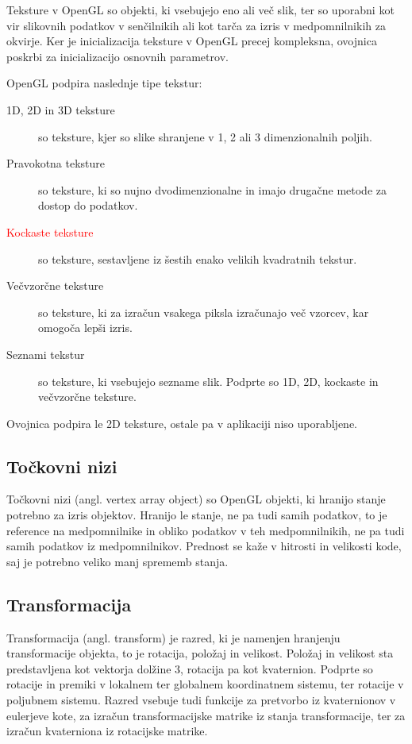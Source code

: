 \documentclass[a4paper, 12pt]{book}
\begin{document}
Teksture v OpenGL so objekti, ki vsebujejo eno ali več slik, ter so uporabni kot vir slikovnih podatkov v senčilnikih ali kot tarča za izris v medpomnilnikih za okvirje. Ker je inicializacija teksture v OpenGL precej kompleksna, ovojnica poskrbi za inicializacijo osnovnih parametrov.

OpenGL podpira naslednje tipe tekstur:

\begin{description}
\item [1D, 2D in 3D teksture]so teksture, kjer so slike shranjene v 1, 2 ali 3 dimenzionalnih poljih.
\item [Pravokotna teksture]so teksture, ki so nujno dvodimenzionalne in imajo drugačne metode za dostop do podatkov.
\item [\textcolor{red}{Kockaste teksture}]so teksture, sestavljene iz šestih enako velikih kvadratnih tekstur.
\item [Večvzorčne teksture]so teksture, ki za izračun vsakega piksla izračunajo več vzorcev, kar omogoča lepši izris.
\item [Seznami tekstur]so teksture, ki vsebujejo sezname slik. Podprte so 1D, 2D, kockaste in večvzorčne teksture.
\end{description}

Ovojnica podpira le 2D teksture, ostale pa v aplikaciji niso uporabljene.

\subsection{Točkovni nizi}

Točkovni nizi (angl. vertex array object) so OpenGL objekti, ki hranijo stanje potrebno za izris objektov. Hranijo le stanje, ne pa tudi samih podatkov, to je reference na medpomnilnike in obliko podatkov v teh medpomnilnikih, ne pa tudi samih podatkov iz medpomnilnikov. Prednost se kaže v hitrosti in velikosti kode, saj je potrebno veliko manj sprememb stanja.

\subsection{Transformacija}

Transformacija (angl. transform) je razred, ki je namenjen hranjenju transformacije objekta, to je rotacija, položaj in velikost. Položaj in velikost sta predstavljena kot vektorja dolžine 3, rotacija pa kot kvaternion\cite{quaternion}. Podprte so rotacije in premiki v lokalnem ter globalnem koordinatnem sistemu, ter rotacije v poljubnem sistemu. Razred vsebuje tudi funkcije za pretvorbo iz kvaternionov v eulerjeve kote, za izračun transformacijske matrike iz stanja transformacije, ter za izračun kvaterniona iz rotacijske matrike.
\end{document}
